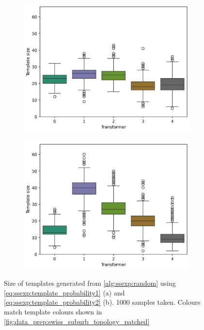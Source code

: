 \begin{figure}[H]
    \begin{subfigure}{.5\textwidth}
      \centering
      \includegraphics[width=\linewidth]{img/switchstate_exploring/swiss_suburb/random_switchstate_distribution_tempalte_p.png}
      \caption{}
      \label{fig:ssexp:switchstate_sampels_trafo_p}
    \end{subfigure}%
    \begin{subfigure}{.5\textwidth}
      \centering
      \includegraphics[width=\linewidth]{img/switchstate_exploring/swiss_suburb/random_switchstate_distribution_choice_p.png}
      \caption{}
      \label{fig:ssexp:switchstate_sampels_choice_p}
    \end{subfigure}
    \caption{
        Size of templates generated from \autoref{alg:ssexp:random}
        using \autoref{eq:ssexp:template_probability1} (a) 
        and \autoref{eq:ssexp:template_probability2} (b).
        1000 samples taken. Colours match template colours shown in
        \autoref{fig:data_prep:swiss_suburb_topology_patched}
    }
    \label{fig:ssexp:switchstate_sampels}
\end{figure}

